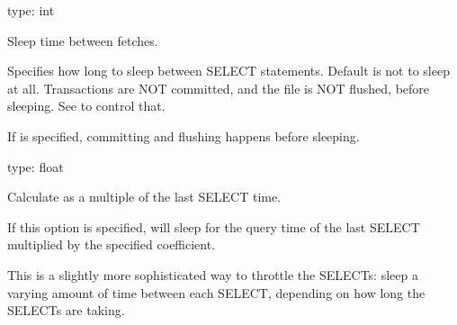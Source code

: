 \documentclass[letterpaper,10pt,english]{sphinxmanual}
\begin{document}
\begin{fulllineitems}
\label{\detokenize{mariadb-archiver:cmdoption-mariadb-archiver-sleep}}
type: int

Sleep time between fetches.

Specifies how long to sleep between SELECT statements.  Default is not to
sleep at all.  Transactions are NOT committed, and the {\hyperref[\detokenize{mariadb-archiver:cmdoption-mariadb-archiver-file}]{}} file is NOT
flushed, before sleeping.  See {\hyperref[\detokenize{mariadb-archiver:cmdoption-mariadb-archiver-txn-size}]{}} to control that.

If {\hyperref[\detokenize{mariadb-archiver:cmdoption-mariadb-archiver-commit-each}]{}} is specified, committing and flushing happens before
sleeping.

\end{fulllineitems}


\begin{fulllineitems}
\label{\detokenize{mariadb-archiver:cmdoption-mariadb-archiver-sleep-coef}}
type: float

Calculate {\hyperref[\detokenize{mariadb-archiver:cmdoption-mariadb-archiver-sleep}]{}} as a multiple of the last SELECT time.

If this option is specified,  will sleep for the query time of the
last SELECT multiplied by the specified coefficient.

This is a slightly more sophisticated way to throttle the SELECTs: sleep a
varying amount of time between each SELECT, depending on how long the SELECTs
are taking.

\end{fulllineitems}
\end{document}
